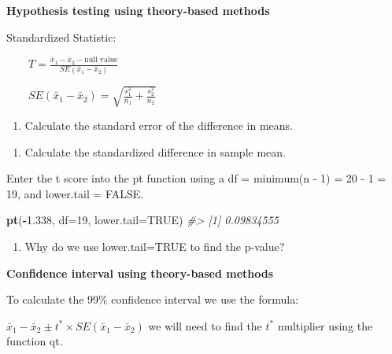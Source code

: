 \documentclass[
]{report}
\newenvironment{Shaded}{\begin{snugshade}}{\end{snugshade}}
\newcommand{\AttributeTok}[1]{\textcolor[rgb]{0.13,0.29,0.53}{#1}}
\newcommand{\CommentTok}[1]{\textcolor[rgb]{0.56,0.35,0.01}{\textit{#1}}}
\newcommand{\ConstantTok}[1]{\textcolor[rgb]{0.56,0.35,0.01}{#1}}
\newcommand{\DecValTok}[1]{\textcolor[rgb]{0.00,0.00,0.81}{#1}}
\newcommand{\FloatTok}[1]{\textcolor[rgb]{0.00,0.00,0.81}{#1}}
\newcommand{\FunctionTok}[1]{\textcolor[rgb]{0.13,0.29,0.53}{\textbf{#1}}}
\newcommand{\NormalTok}[1]{#1}
\newcommand{\SpecialCharTok}[1]{\textcolor[rgb]{0.81,0.36,0.00}{\textbf{#1}}}
\providecommand{\tightlist}{%
  \setlength{\itemsep}{0pt}\setlength{\parskip}{0pt}}
\begin{document}
\textbf{Hypothesis testing using theory-based methods}

Standardized Statistic:

~~~~\(T = \frac{\bar{x}_1 - \bar{x}_2-\mbox{null value}}{SE(\bar{x}_1 - \bar{x}_2)}\)

~~~~\(SE(\bar{x}_1 - \bar{x}_2)=\sqrt{\frac{s_1^2}{n_1}+\frac{s_2^2}{n_2}}\)

\begin{enumerate}
\def\labelenumi{\arabic{enumi}.}
\setcounter{enumi}{7}
\tightlist
\item
  Calculate the standard error of the difference in means.
\end{enumerate}

\vspace{0.5in}

\begin{enumerate}
\def\labelenumi{\arabic{enumi}.}
\setcounter{enumi}{8}
\tightlist
\item
  Calculate the standardized difference in sample mean.
\end{enumerate}

\vspace{0.5in}

Enter the t score into the pt function using a df = minimum(n - 1) = 20 - 1 = 19, and lower.tail = FALSE.

\begin{Shaded}
\begin{Highlighting}[]
\FunctionTok{pt}\NormalTok{(}\SpecialCharTok{{-}}\FloatTok{1.338}\NormalTok{, }\AttributeTok{df=}\DecValTok{19}\NormalTok{, }\AttributeTok{lower.tail=}\ConstantTok{TRUE}\NormalTok{)}
\CommentTok{\#\textgreater{} [1] 0.09834555}
\end{Highlighting}
\end{Shaded}

\begin{enumerate}
\def\labelenumi{\arabic{enumi}.}
\setcounter{enumi}{9}
\tightlist
\item
  Why do we use lower.tail=TRUE to find the p-value?
  \vspace{0.5in}
\end{enumerate}

\textbf{Confidence interval using theory-based methods}

To calculate the 99\% confidence interval we use the formula:

\(\bar{x}_1- \bar{x}_2\pm t^* \times SE(\bar{x}_1- \bar{x}_2)\) we will need to find the \(t^*\) multiplier using the function qt.
\end{document}
